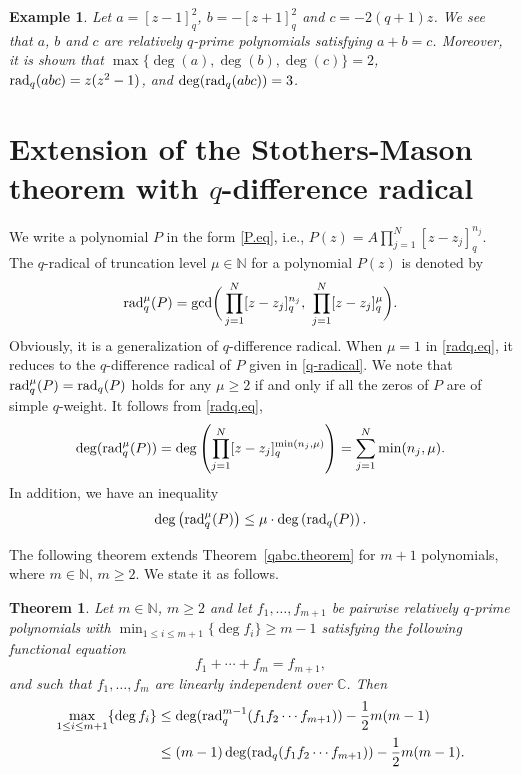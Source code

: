 \documentclass[a4paper,12pt]{article}
\newcommand{\C}{\mathbb{C}}
\newcommand{\N}{\mathbb{N}}
\newtheorem{theorem}[defin]{Theorem}
\newtheorem{exa}{Example}[section]
\newenvironment{example}{\begin{exa}\rm}{\end{exa}}
\numberwithin{equation}{section}
\begin{document}
\begin{example}
Let $a=[z-1]_q^2$, $b=-[z+1]_q^2$ and $c=-2(q+1)z$. We see that $a$, $b$
and $c$ are relatively $q$-prime polynomials satisfying $a+b=c$. Moreover,
it is shown that $\max\{\deg(a),\deg(b),\deg(c)\}=2$, ${{\rm rad}_q(abc)}=z(z^2-1)$,
and $\deg({{\rm rad}_q(abc)})=3$.
\end{example}

\section{Extension of the Stothers-Mason theorem with $q$-difference radical}

We write a polynomial $P$ in the form \eqref{P.eq}, i.e., $P(z)=A\prod_{j=1}^N[z-z_j]_q^{n_j}$.
The $q$-radical of truncation level $\mu\in\N$ for a polynomial $P(z)$ is denoted by
    \begin{equation}\label{radq.eq}
    {\rm rad}_q^\mu(P)={\rm gcd}\bigg(\prod_{j=1}^N[z-z_j]_q^{n_j}, \ \prod_{j=1}^N[z-z_j]_q^{\mu}\bigg).
    \end{equation}
Obviously, it is a generalization of $q$-difference radical. When $\mu=1$ in \eqref{radq.eq}, it reduces to the $q$-difference radical of $P$ given in \eqref{q-radical}.
We note that ${\rm rad}_q^\mu(P)={\rm rad}_q (P)$ holds for any $\mu\geq 2$ if and only if all the zeros of $P$ are of simple $q$-weight.
It follows from \eqref{radq.eq},
\begin{equation}\label{qmu.eq}
\deg({\rm rad}_q^\mu(P))=\deg\left(\prod_{j=1}^N[z-z_j]_q^{\min(n_j,\mu)}\right)=\sum_{j=1}^N \min(n_j,\mu).
\end{equation}
In addition, we have an inequality
    \begin{equation}\label{small.eq}
   \deg\left( {\rm rad}_q^\mu(P)\right)\leq \mu\cdot\deg \left({\rm rad}_q(P)\right).
    \end{equation}

The following theorem extends Theorem~\ref{qabc.theorem} for $m+1$ polynomials, where $m\in\N$, $m\geq2$. We state it as follows.
\begin{theorem}\label{fm.theorem}
Let $m\in \N$, $m\geq2$ and let $f_1,\ldots,f_{m+1}$  be pairwise relatively $q$-prime polynomials with
    $
    \min_{1\leq i\leq m+1} \{\deg f_i\}\geq m-1
    $
satisfying the following functional equation
    $$
    f_1+ \cdots + f_m=f_{m+1},
    $$
and such that $f_1,\dots,f_{m}$ are linearly independent over $\C$. Then
    \begin{equation}\label{q-diffMasonineq}
    \begin{split}
    \max_{1\leq i\leq m+1}\{\deg f_i\}&\leq \deg({\rm rad}_q^{m-1}(f_1f_2\cdots f_{m+1}))-\frac{1}{2}m(m-1)\\
    &\leq (m-1)\deg({\rm rad} _q(f_1f_2\cdots f_{m+1}))-\frac{1}{2}m(m-1).
    \end{split}
    \end{equation}
\end{theorem}
\end{document}
